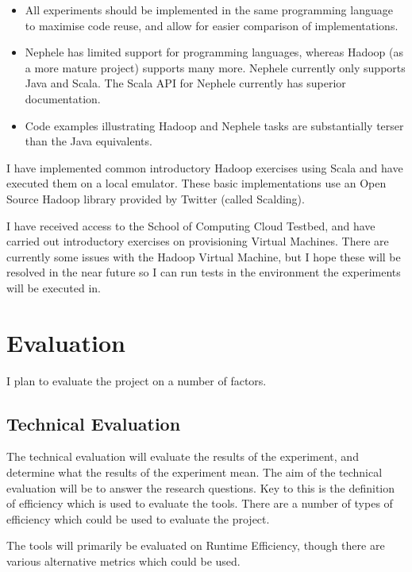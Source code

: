 \begin{itemize}
    \item All experiments should be implemented in the same programming language to maximise code reuse, and allow for easier comparison of implementations.
    \item Nephele has limited support for programming languages, whereas Hadoop (as a more mature project) supports many more. Nephele currently only supports Java and Scala. The Scala API for Nephele currently has superior documentation.
    \item Code examples illustrating Hadoop and Nephele tasks are substantially terser than the Java equivalents.
\end{itemize}

I have implemented common introductory Hadoop exercises using Scala and have executed them on a local emulator. These basic implementations use an Open Source Hadoop library provided by Twitter (called Scalding).

I have received access to the School of Computing Cloud Testbed, and have carried out introductory exercises on provisioning Virtual Machines. There are currently some issues with the Hadoop Virtual Machine, but I hope these will be resolved in the near future so I can run tests in the environment the experiments will be executed in.

\section{Evaluation}
I plan to evaluate the project on a number of factors.

\subsection{Technical Evaluation}
The technical evaluation will evaluate the results of the experiment, and determine what the results of the experiment mean. The aim of the technical evaluation will be to answer the research questions. Key to this is the definition of efficiency which is used to evaluate the tools. There are a number of types of efficiency which could be used to evaluate the project.

The tools will primarily be evaluated on Runtime Efficiency, though there are various alternative metrics which could be used.

